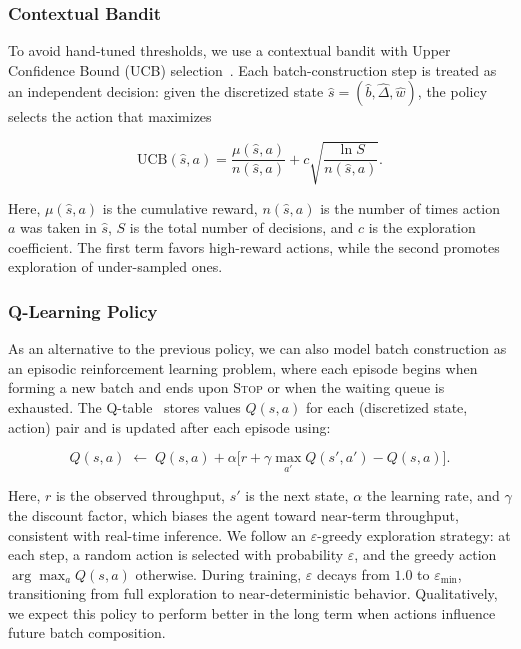 \vspace{-6pt}

\subsubsection*{Contextual Bandit}
To avoid hand-tuned thresholds, we use a contextual bandit with Upper Confidence Bound (UCB) selection~\cite{auer2002finite}. Each batch-construction step is treated as an independent decision: given the discretized state $\hat{s} = (\hat{b}, \hat{\Delta}, \hat{w})$, the policy selects the action that maximizes

\vspace{-10pt}

\[
  \mathrm{UCB}(\hat{s},a) = \frac{\mu(\hat{s},a)}{n(\hat{s},a)} + c\sqrt{\frac{\ln S}{n(\hat{s},a)}}.
\]

\vspace{-6pt}

Here, $\mu(\hat{s}, a)$ is the cumulative reward, $n(\hat{s}, a)$ is the number of times action $a$ was taken in $\hat{s}$, $S$ is the total number of decisions, and $c$ is the exploration coefficient. The first term favors high-reward actions, while the second promotes exploration of under-sampled ones. 

\vspace{-5pt}

\subsubsection*{Q-Learning Policy}
As an alternative to the previous policy, we can also model batch construction as an episodic reinforcement learning problem, where each episode begins when forming a new batch and ends upon \textsc{Stop} or when the waiting queue is exhausted. The Q-table~\cite{watkins1992} stores values $Q(s, a)$ for each (discretized state, action) pair and is updated after each episode using:

\vspace{-14pt}

\[
Q(s, a) \; \leftarrow\; Q(s, a) + \alpha\bigl[r + \gamma \max_{a'} Q(s', a') - Q(s, a)\bigr].
\]

\vspace{-6pt}

Here, $r$ is the observed throughput, $s'$ is the next state, $\alpha$ the learning rate, and $\gamma$ the discount factor, which biases the agent toward near-term throughput, consistent with real-time inference. We follow an $\varepsilon$-greedy exploration strategy: at each step, a random action is selected with probability $\varepsilon$, and the greedy action $\arg\max_a Q(s,a)$ otherwise. During training, $\varepsilon$ decays from $1.0$ to $\varepsilon_{\min}$, transitioning from full exploration to near-deterministic behavior. Qualitatively, we expect this policy to perform better in the long term when actions influence future batch composition.

